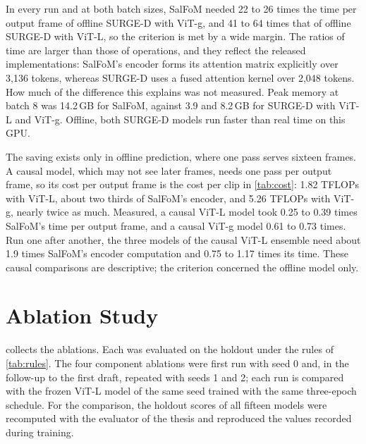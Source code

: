 In every run and at both batch sizes, SalFoM needed 22 to 26 times the time
per output frame of offline SURGE-D with \acrshort{ViT}-g, and 41 to 64 times
that of offline SURGE-D with \acrshort{ViT}-L, so the criterion is met by a
wide margin. The ratios of time are larger than those of operations, and they
reflect the released implementations: SalFoM's encoder forms its attention
matrix explicitly over 3,136 tokens, whereas SURGE-D uses a fused attention
kernel over 2,048 tokens. How much of the difference this explains was not
measured. Peak memory at batch 8 was 14.2\,GB for SalFoM, against 3.9 and
8.2\,GB for SURGE-D with \acrshort{ViT}-L and \acrshort{ViT}-g. Offline, both
SURGE-D models run faster than real time on this \acrshort{GPU}.

The saving exists only in offline prediction, where one pass serves sixteen
frames. A causal model, which may not see later frames, needs one pass per
output frame, so its cost per output frame is the cost per clip in
\cref{tab:cost}: 1.82 \acrshort{TFLOPs} with \acrshort{ViT}-L, about two thirds
of SalFoM's encoder, and 5.26 \acrshort{TFLOPs} with \acrshort{ViT}-g, nearly
twice as much. Measured, a causal \acrshort{ViT}-L model took 0.25 to 0.39
times SalFoM's time per output frame, and a causal \acrshort{ViT}-g model 0.61
to 0.73 times. Run one after another, the three models of the causal
\acrshort{ViT}-L ensemble need about 1.9 times SalFoM's encoder computation and
0.75 to 1.17 times its time. These causal comparisons are descriptive; the
criterion concerned the offline model only.

\section{Ablation Study}\label{sec:ablation}

 collects the ablations. Each was evaluated on the holdout
under the rules of \cref{tab:rules}. The four component ablations were first
run with seed 0 and, in the follow-up to the first draft, repeated with seeds 1
and 2; each run is compared with the frozen \acrshort{ViT}-L model of the same seed
trained with the same three-epoch schedule. For the comparison, the holdout
scores of all fifteen models were recomputed with the evaluator of the thesis
and reproduced the values recorded during training.

